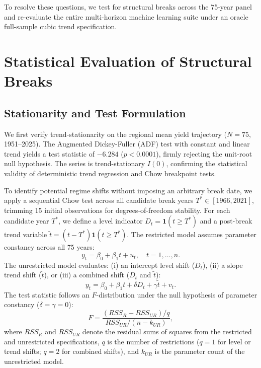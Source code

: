 To resolve these questions, we test for structural breaks across the 75-year panel and re-evaluate the entire multi-horizon machine learning suite under an oracle full-sample cubic trend specification.


\section{Statistical Evaluation of Structural Breaks}
\label{sec:app_chow_test}

\subsection{Stationarity and Test Formulation}
We first verify trend-stationarity on the regional mean yield trajectory ($N = 75$, 1951--2025). The Augmented Dickey-Fuller (ADF) test with constant and linear trend yields a test statistic of $-6.284$ ($p < 0.0001$), firmly rejecting the unit-root null hypothesis. The series is trend-stationary $I(0)$, confirming the statistical validity of deterministic trend regression and Chow breakpoint tests.

To identify potential regime shifts without imposing an arbitrary break date, we apply a sequential Chow test \citep{James2023} across all candidate break years $T^* \in [1966, 2021]$, trimming 15 initial observations for degrees-of-freedom stability. For each candidate year $T^*$, we define a level indicator $D_t = \mathbf{1}(t \ge T^*)$ and a post-break trend variable $\tilde{t} = (t - T^*) \mathbf{1}(t \ge T^*)$. The restricted model assumes parameter constancy across all 75 years:
\begin{equation}
    y_t = \beta_0 + \beta_1 t + u_t, \quad t = 1, \dots, n.
    \label{eq:chow_restricted}
\end{equation}
The unrestricted model evaluates: (i) an intercept level shift ($D_t$), (ii) a slope trend shift ($\tilde{t}$), or (iii) a combined shift ($D_t$ and $\tilde{t}$):
\begin{equation}
    y_t = \beta_0 + \beta_1 t + \delta D_t + \gamma \tilde{t} + v_t.
    \label{eq:chow_unrestricted}
\end{equation}
The test statistic follows an $F$-distribution under the null hypothesis of parameter constancy ($\delta = \gamma = 0$):
\begin{equation}
    F = \frac{(RSS_R - RSS_{UR}) / q}{RSS_{UR} / (n - k_{UR})},
    \label{eq:chow_f_stat}
\end{equation}
where $RSS_R$ and $RSS_{UR}$ denote the residual sums of squares from the restricted and unrestricted specifications, $q$ is the number of restrictions ($q=1$ for level or trend shifts; $q=2$ for combined shifts), and $k_{UR}$ is the parameter count of the unrestricted model.


